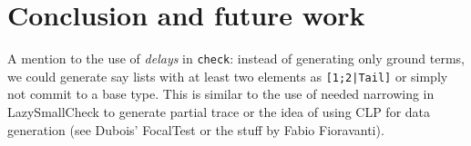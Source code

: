 \section{Conclusion and future work}


A mention to the use of \emph{delays} in \texttt{check}: instead of generating only ground terms, we could generate say lists with at least two elements as \texttt{[1;2|Tail]} or simply not commit to a base type. This  is similar to the use of needed narrowing in LazySmallCheck to generate partial trace or the idea of using CLP for data generation (see Dubois' FocalTest or the stuff by Fabio Fioravanti).
